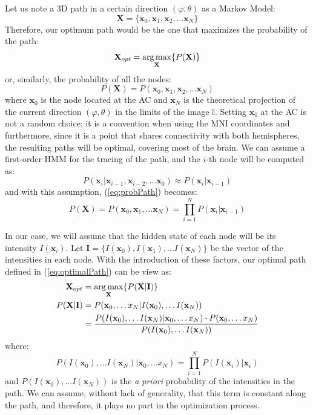 Let us note a 3D path in a certain direction $(\varphi,\theta)$ as a Markov Model\cite{Chen2008}: 
\begin{equation}
\mathbf{X} = \{\mathbf{x}_0, \mathbf{x}_1, \mathbf{x}_2, \dots \mathbf{x}_N\}
\end{equation}
Therefore, our optimum path would be the one that maximizes the probability of the path:
\begin{equation}\label{eq:optimalPath}
\mathbf{X}_{opt} = \operatorname*{arg\,max}_\mathbf{X} \{P(\mathbf{X})\}
\end{equation}
or, similarly, the probability of all the nodes:
\begin{equation}\label{eq:probPath}
P(\mathbf{X}) = P(\mathbf{x}_0, \mathbf{x}_1, \mathbf{x}_2, \dots \mathbf{x}_N)
\end{equation}
where $\mathbf{x}_0$ is the node located at the AC and $\mathbf{x}_N$ is the theoretical projection of the current direction $(\varphi,\theta)$ in the limits of the image $\mathbb{I}$. Setting $\mathbf{x}_0$ at the AC is not a random choice; it is a convention when using the \ac{MNI} coordinates\cite{Evans1993} and furthermore, since it is a point that shares connectivity with both hemispheres, the resulting paths will be optimal, covering most of the brain. We can assume a first-order \acf{HMM} for the tracing of the path, and the $i$-th node will be computed as:
\begin{equation}
P(\mathbf{x}_i | \mathbf{x}_{i-1}, \mathbf{x}_{i-2}, \dots \mathbf{x}_0) \approx P(\mathbf{x}_i|\mathbf{x}_{i-1})
\end{equation}
and with this assumption, (\ref{eq:probPath}) becomes:
\begin{equation}
P(\mathbf{X}) = P(\mathbf{x}_0, \mathbf{x}_1, \dots \mathbf{x}_N) = \prod_{i=1}^{N} P(\mathbf{x}_i|\mathbf{x}_{i-1})
\end{equation} 

In our case, we will assume that the hidden state of each node will be its intensity $I(\mathbf{x}_i)$. Let $\mathbf{I} = \{I(\mathbf{x}_0), I(\mathbf{x}_1), \dots I(\mathbf{x}_N)\}$ be the vector of the intensities in each node. With the introduction of these factors, our optimal path defined in (\ref{eq:optimalPath}) can be view as:
\begin{align}
\mathbf{X}_{opt} & = \operatorname*{arg\,max}_\mathbf{X} \{P(\mathbf{X}|\mathbf{I})\}\\
P(\mathbf{X}|\mathbf{I}) & = P(\mathbf{x}_0, \dots x_N| I(\mathbf{x}_0), \dots I(\mathbf{x}_N))\\
& = \frac{P(I(\mathbf{x}_0), \dots I(\mathbf{x}_N)|\mathbf{x}_0, \dots x_N)\cdot P(\mathbf{x}_0, \dots x_N)}{P(I(\mathbf{x}_0), \dots I(\mathbf{x}_N))}\label{eq:final}
\end{align}
where:
\begin{equation}\label{eq:intP}
P(I(\mathbf{x}_0), \dots I(\mathbf{x}_N)|\mathbf{x}_0, \dots x_N)  = \prod_{i=1}^{N} P (I(\mathbf{x}_i)|\mathbf{x}_i)
\end{equation}
and $P(I(\mathbf{x}_0), \dots I(\mathbf{x}_N))$ is the \textit{a priori} probability of the intensities in the path. We can assume, without lack of generality, that this term is constant along the path, and therefore, it plays no part in the optimization process.

